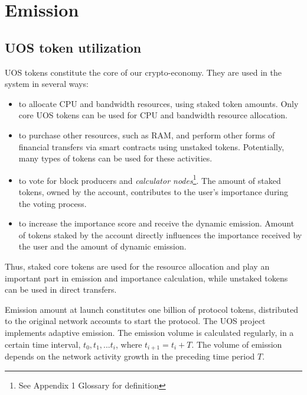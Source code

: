 \documentclass[a4paper,12pt]{article}
\begin{document}
\section{Emission}

\subsection{U{\degree}OS token utilization}

U{\degree}OS tokens constitute the core of our crypto-economy. They are used in the system in several ways:

\begin{itemize}
\item to allocate CPU and bandwidth resources, using staked token amounts. Only core U{\degree}OS tokens can be used for CPU and bandwidth resource allocation.
\item to purchase other resources, such as RAM, and perform other forms of financial transfers via smart contracts using unstaked tokens. Potentially, many types of tokens can be used for these activities.
\item to vote for block producers and \emph{calculator nodes}\footnote{See Appendix 1 Glossary for definition}. The amount of staked tokens, owned by the account, contributes to the user's importance during the voting process.
\item to increase the importance score and receive the dynamic emission. Amount of tokens staked by the account directly influences the importance received by the user and the amount of dynamic emission.
\end{itemize}

Thus, staked core tokens are used for the resource allocation and play an important part in emission and importance calculation, while unstaked tokens can be used in direct transfers. 

Emission amount at launch constitutes one billion of protocol tokens, distributed to the original network accounts to start the protocol. The U{\degree}OS project implements adaptive emission. The emission volume is calculated regularly, in a certain time interval, $t_0, t_1, ... t_i$, where $t_{i+1} = t_i + T$. The volume of emission depends on the network activity growth in the preceding time period $T$.
\end{document}
